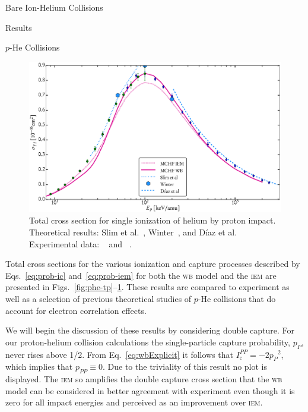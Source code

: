 \documentclass[letterpaper, 11 pt]{report}
\begin{document}
\begin{chapter}{Bare Ion-Helium Collisions \label{chap:p-he2p-he}}
\begin{section}{Results \label{sec:phe2p-res}}
\begin{subsection}{\texorpdfstring{$p$}{p}-He Collisions \label{sec:phe-res}}
         \begin{figure}[t]
            \centering
            \includegraphics[width = 0.95 \linewidth]{./images/phe/phe-TI.eps}
            \caption[Total cross section for single ionization of helium by proton impact.]
                    {Total cross section for single ionization of helium by proton impact.
                     Theoretical results: Slim et al.~\cite{SHBF-91},
                     Winter~\cite{Winter-91}, and D\'{i}az et al.~\cite{DMS-00}
                     Experimental data: {\color{OliveGreen}{$\bullet$}}~\cite{SG89} and
                     {\color{blue}{$\blacklozenge$}}~\cite{SG85}. \label{fig:phe-ti}}
         \end{figure}

         Total cross sections for the various ionization and capture processes described by
         Eqs.~\eqref{eq:prob-ic} and~\eqref{eq:prob-iem} for both the \textsc{wb} model and the
         \textsc{iem} are presented in Figs.~\ref{fig:phe-tp}--\ref{fig:phe-ti}. These results are
         compared to experiment as well as a selection of previous theoretical studies of $p$-He
         collisions that do account for electron correlation effects.

         We will begin the discussion of these results by considering double capture. For our
         proton-helium collision calculations the single-particle capture probability, $p_P$, never
         rises above 1/2. From Eq.~\eqref{eq:wbExplicit} it follows that $I^{PP}_\mathrm{c} =
         -2 {p_P}^2$, which implies that $p_{PP} \equiv 0$. Due to the triviality of this result no plot
         is displayed. The \textsc{iem} so amplifies the double capture cross section that the
         \textsc{wb} model can be considered in better agreement with experiment even though it is zero
         for all impact energies and perceived as an improvement over \textsc{iem}.


\end{subsection}
\end{section}
\end{chapter}
\end{document}
